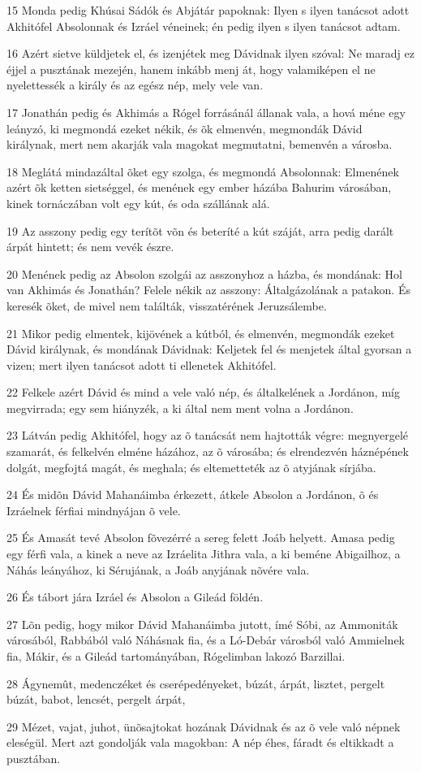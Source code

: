 \par 15 Monda pedig Khúsai Sádók és Abjátár papoknak: Ilyen s ilyen tanácsot adott Akhitófel Absolonnak és Izráel véneinek; én pedig ilyen s ilyen tanácsot adtam.
\par 16 Azért sietve küldjetek el, és izenjétek meg Dávidnak ilyen szóval: Ne maradj ez éjjel a pusztának mezején, hanem inkább menj át, hogy valamiképen el ne nyelettessék a király és az egész nép, mely vele van.
\par 17 Jonathán pedig és Akhimás a Rógel  forrásánál állanak vala, a hová méne egy leányzó, ki megmondá ezeket nékik, és õk elmenvén, megmondák Dávid királynak, mert nem akarják vala magokat megmutatni, bemenvén a városba.
\par 18 Meglátá mindazáltal õket egy szolga, és megmondá Absolonnak: Elmenének azért õk ketten sietséggel, és menének egy ember házába Bahurim városában, kinek tornáczában volt egy kút, és oda szállának alá.
\par 19 Az asszony pedig egy terítõt võn és beteríté a kút száját, arra pedig darált árpát hintett; és nem vevék észre.
\par 20 Menének pedig az Absolon szolgái az asszonyhoz a házba, és mondának: Hol van Akhimás és Jonathán? Felele nékik az asszony: Általgázolának a patakon. És keresék õket, de mivel nem találták, visszatérének Jeruzsálembe.
\par 21 Mikor pedig elmentek, kijövének a kútból, és elmenvén, megmondák ezeket Dávid királynak, és mondának Dávidnak: Keljetek fel és menjetek által gyorsan a vizen; mert ilyen tanácsot adott ti ellenetek Akhitófel.
\par 22 Felkele azért Dávid és mind a vele való nép, és általkelének a Jordánon, míg megvirrada; egy sem hiányzék, a ki által nem ment volna a Jordánon.
\par 23 Látván pedig Akhitófel, hogy az õ tanácsát nem hajtották végre: megnyergelé szamarát, és felkelvén elméne házához, az õ városába; és elrendezvén háznépének dolgát, megfojtá  magát, és meghala; és eltemetteték az õ atyjának sírjába.
\par 24 És midõn Dávid Mahanáimba érkezett, átkele Absolon a Jordánon, õ és Izráelnek férfiai mindnyájan õ vele.
\par 25 És Amasát tevé Absolon fõvezérré a sereg felett Joáb helyett. Amasa pedig egy férfi vala, a kinek a neve az Izráelita Jithra vala, a ki beméne Abigailhoz,  a Náhás leányához, ki Sérujának, a Joáb anyjának nõvére vala.
\par 26 És tábort jára Izráel és Absolon a Gileád földén.
\par 27 Lõn pedig, hogy mikor Dávid Mahanáimba jutott, ímé Sóbi, az Ammoniták városából, Rabbából való Náhásnak fia, és a Ló-Debár városból való Ammielnek fia, Mákir, és a Gileád tartományában, Rógelimban lakozó  Barzillai.
\par 28 Ágynemût, medenczéket és cserépedényeket, búzát, árpát, lisztet, pergelt búzát, babot, lencsét, pergelt árpát,
\par 29 Mézet, vajat, juhot, ünõsajtokat hozának Dávidnak és az õ vele való népnek eleségül. Mert azt gondolják vala magokban: A nép éhes, fáradt és eltikkadt a pusztában.

